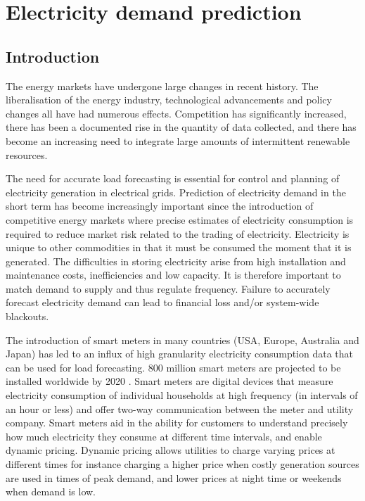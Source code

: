 \chapter{Electricity demand prediction}

\ifpdf
    \graphicspath{{Chapter3/Figs/Raster/}{Chapter3/Figs/PDF/}{Chapter3/Figs/}}
\else
    \graphicspath{{Chapter3/Figs/Vector/}{Chapter3/Figs/}}
\fi


\section{Introduction}

The energy markets have undergone large changes in recent history. The liberalisation of the energy industry, technological advancements and policy changes all have had numerous effects. Competition has significantly increased, there has been a documented rise in the quantity of data collected, and there has become an increasing need to integrate large amounts of intermittent renewable resources.

The need for accurate load forecasting is essential for control and planning of electricity generation in electrical grids. Prediction of electricity demand in the short term has become increasingly important since the introduction of competitive energy markets where precise estimates of electricity consumption is required to reduce market risk related to the trading of electricity. Electricity is unique to other commodities in that it must be consumed the moment that it is generated. The difficulties in storing electricity arise from high installation and maintenance costs, inefficiencies and low capacity. It is therefore important to match demand to supply and thus regulate frequency. Failure to accurately forecast electricity demand can lead to financial loss and/or system-wide blackouts.

The introduction of smart meters in many countries (USA, Europe, Australia and Japan) has led to an influx of high granularity electricity consumption data that can be used for load forecasting. 800 million smart meters are projected to be installed worldwide by 2020 \cite{Telefonica2014}. Smart meters are digital devices that measure electricity consumption of individual households at high frequency (in intervals of an hour or less) and offer two-way communication between the meter and utility company. Smart meters aid in the ability for customers to understand precisely how much electricity they consume at different time intervals, and enable dynamic pricing. Dynamic pricing allows utilities to charge varying prices at different times for instance charging a higher price when costly generation sources are used in times of peak demand, and lower prices at night time or weekends when demand is low. 

